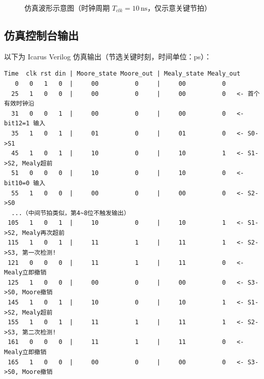 \documentclass[12pt,a4paper]{article}
\begin{document}
\begin{figure}[H]
\caption{仿真波形示意图（时钟周期 $T_{clk}=10\,\text{ns}$，仅示意关键节拍）}
\label{fig:waveform}
\end{figure}

\subsection{仿真控制台输出}

以下为 Icarus Verilog 仿真输出（节选关键时刻，时间单位：ps）：

\begin{lstlisting}[language={}, basicstyle=\tiny\ttfamily, frame=single,
                   caption={仿真 \$monitor 输出（节选）}, label=lst:sim_out]
Time  clk rst din | Moore_state Moore_out | Mealy_state Mealy_out
   0   0   1   0  |     00          0     |     00          0
  25   1   0   0  |     00          0     |     00          0   <- 首个有效时钟沿
  31   0   0   1  |     00          0     |     00          0   <- bit12=1 输入
  35   1   0   1  |     01          0     |     01          0   <- S0->S1
  45   1   0   1  |     10          0     |     10          1   <- S1->S2, Mealy超前
  51   0   0   0  |     10          0     |     10          0   <- bit10=0 输入
  55   1   0   0  |     00          0     |     00          0   <- S2->S0
  ...（中间节拍类似，第4~8位不触发输出）
 105   1   0   1  |     10          0     |     10          1   <- S1->S2, Mealy再次超前
 115   1   0   1  |     11          1     |     11          1   <- S2->S3, 第一次检测!
 121   0   0   0  |     11          1     |     11          0   <- Mealy立即撤销
 125   1   0   0  |     00          0     |     00          0   <- S3->S0, Moore撤销
 145   1   0   1  |     10          0     |     10          1   <- S1->S2, Mealy超前
 155   1   0   1  |     11          1     |     11          1   <- S2->S3, 第二次检测!
 161   0   0   0  |     11          1     |     11          0   <- Mealy立即撤销
 165   1   0   0  |     00          0     |     00          0   <- S3->S0, Moore撤销
\end{lstlisting}
\end{document}
